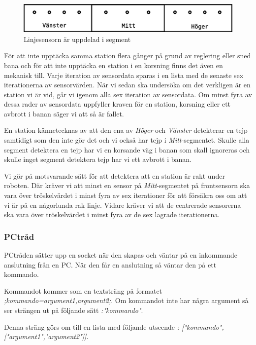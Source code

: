 \begin{figure}[h!]
	\centering
	\includegraphics[scale=0.4]{grafik/huvud-linjesensor}
	\caption{Linjesensorn är uppdelad i segment} \label{huvud-linjesensor}
\end{figure}

För att inte upptäcka samma station flera gånger på grund av reglering eller sned bana och för att inte upptäcka en station i en korsning finns det även en mekanisk till. Varje iteration av sensordata sparas i en lista med de senaste sex iterationerna av sensorvärden. När vi sedan ska undersöka om det verkligen är en station vi är vid, går vi igenom alla sex iteration av sensordata. Om minst fyra av dessa rader av sensordata uppfyller kraven för en station, korsning eller ett avbrott i banan säger vi att så är fallet.

En station kännetecknas av att den ena av \textit{Höger} och \textit{Vänster} detekterar en tejp samtidigt som den inte gör det och vi också har tejp i \textit{Mitt}-segmentet. Skulle alla segment detektera en tejp har vi en korsande väg i banan som skall ignoreras och skulle inget segment detektera tejp har vi ett avbrott i banan.

Vi gör på motsvarande sätt för att detektera att en station är rakt under roboten. Där kräver vi att minst en sensor på \textit{Mitt}-segmentet på frontsensorn ska vara över tröskelvärdet i minst fyra av sex iterationer för att försäkra oss om att vi är på en någorlunda rak linje. Vidare kräver vi att de centrerade sensorerna ska vara över tröskelvärdet i minst fyra av de sex lagrade iterationerna.

\subsubsection{PCtråd}
PCtråden sätter upp en socket när den skapas och väntar på en inkommande anslutning från en PC. När den får en anslutning så väntar den på ett kommando.

 Kommandot kommer som en textsträng på formatet \textit{;kommando=argument1,argument2;}. Om kommandot inte har några argument så ser strängen ut på följande sätt \textit{:"kommando"}.

Denna sträng görs om till en lista med följande utseende \textit{: ["kommando",["argument1","argument2"]]}.

